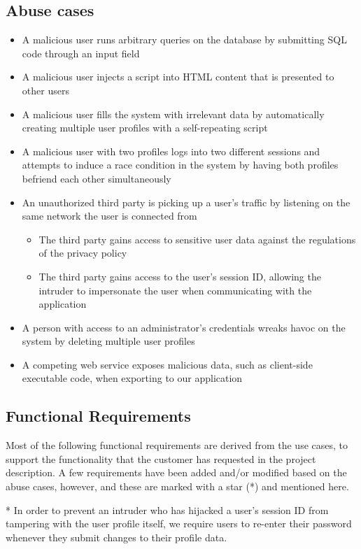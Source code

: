 \documentclass[a4paper]{article}
\begin{document}
\subsection{Abuse cases}
\begin{itemize}
\item A malicious user runs arbitrary queries on the database by submitting SQL code through an input field
\item A malicious user injects a script into HTML content that is presented to other users
\item A malicious user fills the system with irrelevant data by automatically creating multiple user profiles with a self-repeating script
\item A malicious user with two profiles logs into two different sessions and attempts to induce a race condition in the system by having both profiles befriend each other simultaneously
\item An unauthorized third party is picking up a user's traffic by listening on the same network the user is connected from
	\begin{itemize}
		\item The third party gains access to sensitive user data against the regulations of the privacy policy
		\item The third party gains access to the user's session ID, allowing the intruder to impersonate the user when communicating with the application
	\end{itemize}
\item A person with access to an administrator's credentials wreaks havoc on the system by deleting multiple user profiles
\item A competing web service exposes malicious data, such as client-side executable code, when exporting to our application
\end{itemize}

\subsection{Functional Requirements}
Most of the following functional requirements are derived from the use cases, to support the functionality that the customer has requested in the project description. A few requirements have been added and/or modified based on the abuse cases, however, and these are marked with a star (*) and mentioned here.

* In order to prevent an intruder who has hijacked a user's session ID from tampering with the user profile itself, we require users to re-enter their password whenever they submit changes to their profile data.
\end{document}
